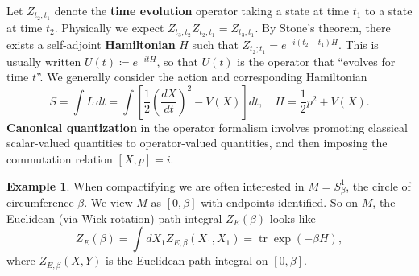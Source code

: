 \documentclass{report}
\theoremstyle{plain}
\theoremstyle{definition}
\newtheorem{example}[theorem]{Example}
\theoremstyle{remark}
\newcommand{\FR}[2]{\frac{#1}{#2}}
\newcommand{\PFR}[2]{\left(\frac{#1}{#2}\right)}
\DeclareMathOperator{\Tr}{tr}
\begin{document}
Let $Z_{t_2;t_1}$ denote the {\bf time evolution} operator taking a
state at time $t_1$ to a state at time $t_2$. Physically we expect
$Z_{t_3;t_2} Z_{t_2;t_1} = Z_{t_3;t_1}$. By Stone's theorem, there
exists a self-adjoint {\bf Hamiltonian} $H$ such that $Z_{t_2;t_1} =
e^{-i(t_2-t_1)H}$. This is usually written $U(t) \coloneqq e^{-itH}$,
so that $U(t)$ is the operator that ``evolves for time $t$''. We
generally consider the action and corresponding Hamiltonian
\[ S = \int L\, dt = \int \left[\FR{1}{2}\PFR{dX}{dt}^2-V(X)\right]dt, \quad H = \FR{1}{2}p^2 + V(X). \]
{\bf Canonical quantization} in the operator formalism involves
promoting classical scalar-valued quantities to operator-valued
quantities, and then imposing the commutation relation $[X, p] = i$.

\begin{example} \label{ex:qm-on-circle}
  When compactifying we are often interested in $M = S^1_\beta$, the
  circle of circumference $\beta$. We view $M$ as $[0, \beta]$ with
  endpoints identified. So on $M$, the Euclidean (via Wick-rotation)
  path integral $Z_E(\beta)$ looks like
  \[ Z_E(\beta) = \int dX_1 Z_{E,\beta}(X_1,X_1) = \Tr\exp(-\beta H), \]
  where $Z_{E,\beta}(X, Y)$ is the Euclidean path integral on $[0,
    \beta]$.
\end{example}
\end{document}
